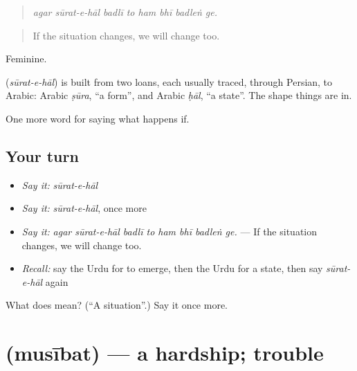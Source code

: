 \begin{quote}
        
\end{quote}

\begin{quote}
\emph{agar sūrat-e-hāl badlī to ham bhī badleṅ ge.}
\end{quote}

\begin{quote}
If the situation changes, we will change too.
\end{quote}

Feminine.

\begin{cousinweb}
\textbf{ } (\emph{sūrat-e-hāl}) is built from two loans, each usually traced, through Persian, to Arabic: Arabic \emph{ṣūra}, \textquotedblleft{}a form\textquotedblright{}, and Arabic \emph{ḥāl}, \textquotedblleft{}a state\textquotedblright{}. The shape things are in.
\end{cousinweb}

\begin{grammarlens}[title={What you've built}]
One more word for saying what happens if.
\end{grammarlens}

\subsection*{Your turn}
\begin{itemize}
\raggedright
  \item \emph{Say it:} \emph{sūrat-e-hāl}
  \item \emph{Say it:} \emph{sūrat-e-hāl}, once more
  \item \emph{Say it:} \emph{agar sūrat-e-hāl badlī to ham bhī badleṅ ge.} — If the situation changes, we will change too.
  \item \emph{Recall:} say the Urdu for to emerge, then the Urdu for a state, then say \emph{sūrat-e-hāl} again
\end{itemize}

\begin{tcolorbox}[breakable,colback=teal!4,colframe=teal!35!black,title={Before you move on}]
What does   mean? (\textquotedblleft{}A situation\textquotedblright{}.) Say it once more.
\end{tcolorbox}
\section[\texorpdfstring{\ur{مصیبت} (musībat)}{مصیبت (musībat)}]{ (musībat) — a hardship; trouble}


